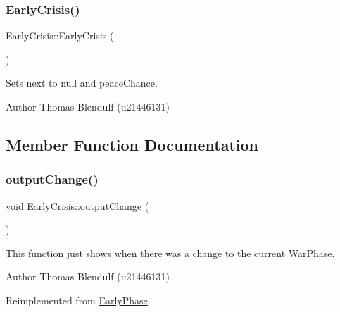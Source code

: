 \subsubsection{\texorpdfstring{EarlyCrisis()}{EarlyCrisis()}}
{\footnotesize\ttfamily Early\+Crisis\+::\+Early\+Crisis (\begin{DoxyParamCaption}{ }\end{DoxyParamCaption})}



Sets next to null and peace\+Chance. 

\begin{DoxyAuthor}{Author}
Thomas Blendulf (u21446131) 
\end{DoxyAuthor}


\subsection{Member Function Documentation}
\mbox{\label{class_early_crisis_af25e06788b565ba54a431175ab4c3c53}} 
\subsubsection{\texorpdfstring{outputChange()}{outputChange()}}
{\footnotesize\ttfamily void Early\+Crisis\+::output\+Change (\begin{DoxyParamCaption}{ }\end{DoxyParamCaption})\hspace{0.3cm}{\ttfamily [virtual]}}



\mbox{\hyperlink{class_this}{This}} function just shows when there was a change to the current \mbox{\hyperlink{class_war_phase}{War\+Phase}}. 

\begin{DoxyAuthor}{Author}
Thomas Blendulf (u21446131) 
\end{DoxyAuthor}


Reimplemented from \mbox{\hyperlink{class_early_phase_a4dec6915b8c177199bc2b92a49fdb3af}{Early\+Phase}}.

